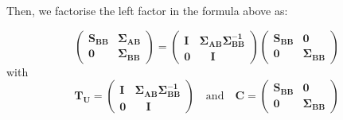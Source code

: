 \documentclass{book}
\begin{document}
Then, we factorise the left factor in the formula above as:

$$
 \left( \begin{array}{ll} \mathbf{S_{BB}}  & \mathbf{\Sigma_{AB}}
	\\ \mathbf{0} & \mathbf{\Sigma_{BB}}  \end{array}
\right) 
 =  \left( \begin{array}{ll} 
	\mathbf{I} &  \mathbf{\Sigma_{AB}} \mathbf{\Sigma_{BB}^{-1}}
	\\ \mathbf{0} & \quad \mathbf{I} \quad
\end{array}
\right)
\left( \begin{array}{ll} 
	\mathbf{S_{BB}}   & \mathbf{0}\\ 
	\mathbf{0}  & \mathbf{\Sigma_{BB}}
\end{array} \right)
$$
with
$$ \mathbf{T_U} =
\left( \begin{array}{ll} 
	\mathbf{I} &  \mathbf{\Sigma_{AB}} \mathbf{\Sigma_{BB}^{-1}}
	\\ \mathbf{0} & \quad \mathbf{I} \quad
\end{array}
\right)  \quad \text{and} \quad \mathbf{C} =
\left( \begin{array}{ll} 
	\mathbf{S_{BB}}   & \mathbf{0}\\ 
	\mathbf{0}  & \mathbf{\Sigma_{BB}}
\end{array} \right) 
$$
\end{document}

